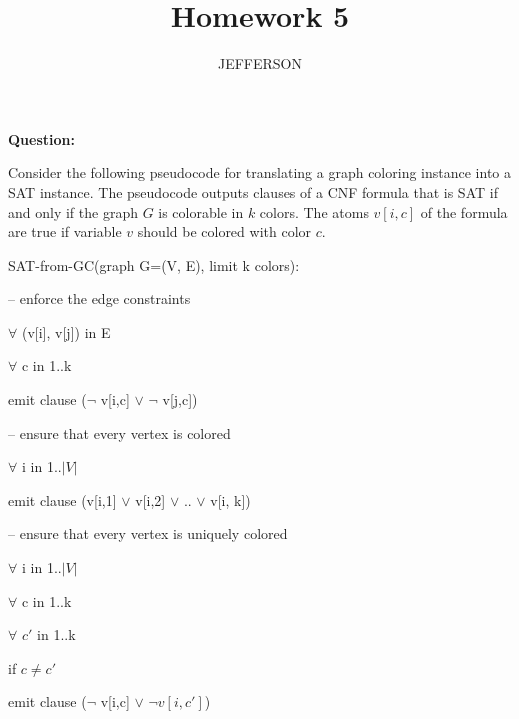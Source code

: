 \documentclass[11pt,letterpaper,oneside]{article}
\title{Homework 5}
\author{JEFFERSON}
\date{}
\begin{document}
\maketitle


\noindent\textbf{Question:}

Consider the following pseudocode for translating a graph coloring instance into a SAT instance. The pseudocode outputs clauses of a CNF formula that is SAT if and only if the graph $G$ is colorable in $k$ colors. The atoms $v[i,c]$ of the formula are true if variable $v$ should be colored with color $c$.

\vspace{1em}\hspace{2em} SAT-from-GC(graph G=(V, E), limit k colors):

\hspace{3em}     -- enforce the edge constraints 

\hspace{3em}     $\forall$ (v[i], v[j]) in E 

\hspace{4em}         $\forall$ c in 1..k 

\hspace{5em}             emit clause ($\neg$ v[i,c] $\vee$ $\neg$ v[j,c]) 

\hspace{3em}     -- ensure that every vertex is colored 

\hspace{3em}     $\forall$ i in 1..$|V|$ 

\hspace{4em}         emit clause (v[i,1] $\vee$ v[i,2] $\vee$ .. $\vee$ v[i, k]) 

\hspace{3em}     -- ensure that every vertex is uniquely colored 

\hspace{3em}     $\forall$ i in 1..$|V|$ 

\hspace{4em}         $\forall$ c in 1..k 

\hspace{5em}             $\forall$ $c'$ in 1..k 

\hspace{6em}                 if $c \neq c'$

\hspace{7em}                     emit clause ($\neg$ v[i,c] $\vee$ $\neg v[i,c']$)
\end{document}
